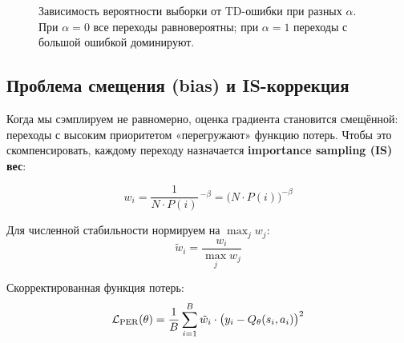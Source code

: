 \documentclass[a4paper, 11pt]{article}
\begin{document}
\begin{figure}[h]
\centering
{}
\caption{Зависимость вероятности выборки от TD-ошибки при разных $\alpha$.
При $\alpha=0$ все переходы равновероятны; при $\alpha=1$ переходы с
большой ошибкой доминируют.}
\end{figure}

\subsection{Проблема смещения (bias) и IS-коррекция}

Когда мы сэмплируем не равномерно, оценка градиента становится
смещённой: переходы с высоким приоритетом «перегружают» функцию потерь.
Чтобы это скомпенсировать, каждому переходу назначается
\textbf{importance sampling (IS) вес}:

\begin{equation}
  w_i = \frac{1}{N \cdot P(i)}\,^{-\beta}
      = \bigl(N \cdot P(i)\bigr)^{-\beta}
  \label{eq:is_weight_raw}
\end{equation}

Для численной стабильности нормируем на $\max_j w_j$:
\[
  \tilde{w}_i = \frac{w_i}{\max_j w_j}
\]

Скорректированная функция потерь:
\begin{equation}
  \mathcal{L}_{\rm PER}(\theta)
  = \frac{1}{B} \sum_{i=1}^{B}
    \tilde{w}_i \cdot \bigl(y_i - Q_\theta(s_i, a_i)\bigr)^2
  \label{eq:per_loss}
\end{equation}
\end{document}
